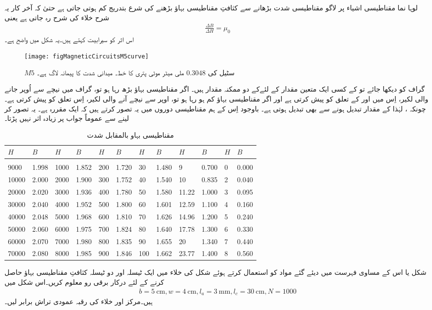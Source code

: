 لوہا نما مقناطیسی اشیاء پر لاگو مقناطیسی شدت بڑھانے سے کثافتِ مقناطیسی بہاؤ بڑھنے کی شرع بتدریج کم ہوتی جاتی ہے حتیٰ کہ آخر کار یہ شرح خلاء کی شرح   رہ جاتی ہے یعنی
\begin{align}
\frac{\Delta B}{\Delta H}=\mu_0
\end{align}
اس اثر کو سیرابیت کہتے ہیں۔یہ شکل   میں واضح ہے۔
\begin{figure}
\centering
\texttt{[image: figMagneticCircuitsM5curve]}
\caption{$M5$ سٹیل کی $0.3048$ ملی میٹر موٹی پتری کا خط۔ میدانی شدت کا پیمانہ لاگ ہے۔}
\label{شکل_مقناطیسی_ادوار_ایم_پانچ_پتری_کا_خط}
\end{figure}
%
گراف کو دیکھا جائے تو  کے کسی ایک متعین مقدار  کے لئےکے دو ممکنہ مقدار ہیں۔ اگر مقناطیسی بہاؤ بڑھ رہا ہو تو، گراف میں نیچے سے اُوپر جانے والی لکیر، اِس میں  اور  کے تعلق کو پیش کرتی ہے اور اگر مقناطیسی بہاؤ کم ہو رہا ہو تو، اوپر سے نیچے آنے والی لکیر، اِس تعلق کو پیش کرتی ہے۔  چونکہ  ، لہٰذا  کے  مقدار تبدیل ہونے سے  بھی تبدیل ہوتی ہے۔ باوجود اِس کے ہم مقناطیسی دوروں میں یہ تصور کرتے ہیں کہ  ایک مقررہ ہے۔ یہ تصور کر لینے سے عموماً جواب پر زیادہ اثر نہیں پڑتا۔
%
\begin{table}
\begin{tabular}{l l l l   l l l l   l l l l}
$H$&$B$&$H$&$B$&$H$&$B$&$H$&$B$&$H$&$B$&$H$&$B$\\
\hline\\
9000&1.998&1000&1.852&           200&1.720 &30&1.480               &9&0.700&  0&0.000    \\
10000&2.000&2000&1.900&         300&1.752 &40&1.540           &10&0.835&  2&0.040    \\
20000&2.020&3000&1.936&         400&1.780 &50&1.580          &11.22&1.000&  3&0.095    \\
30000&2.040& 4000&1.952&        500&1.800 &60&1.601         &12.59&1.100 &  4&0.160    \\
40000&2.048&5000&1.968&         600&1.810 &70&1.626          &14.96&1.200&   5&0.240    \\
50000&2.060&6000&1.975&         700&1.824 &80&1.640         &17.78&1.300&  6&0.330    \\
60000&2.070&7000&1.980&         800&1.835  &90&1.655         &20&1.340&  7&0.440    \\
 70000&2.080&8000&1.985&        900&1.846 &100&1.662          &23.77&1.400& 8&0.560    \\
\hline
\end{tabular}
\caption{مقناطیسی بہاو بالمقابل شدت}
\label{جدول_مقناطیسی_ادوار_کثافت_بہاو_بالمقابل_شدت}
\end{table}
%
شکل  یا اس کے مساوی فہرست میں دیئے گئے مواد کو استعمال کرتے ہوئے شکل  کی خلاء میں ایک ٹیسلہ اور دو ٹیسلہ کثافتِ  مقناطیسی بہاؤ حاصل کرنے کے لئے درکار برقی رو معلوم کریں۔اس شکل میں
\begin{align*}
b=\SI{5}{\centi\meter},w=\SI{4}{\centi\meter},l_a=\SI{3}{\milli\meter},l_c=\SI{30}{\centi\meter},N=1000
\end{align*}
ہیں۔مرکز اور خلاء کی رقبہ عمودی تراش برابر لیں۔


